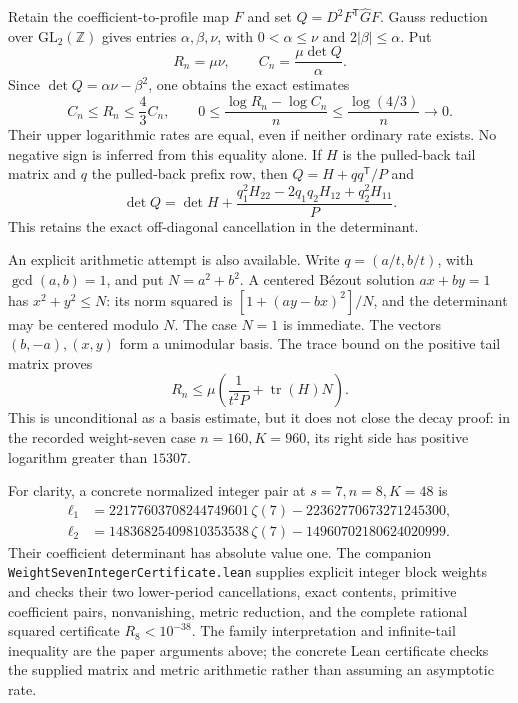 \documentclass[11pt]{article}
\theoremstyle{remark}
\newcommand{\Z}{\mathbb Z}
\begin{document}
Retain the coefficient-to-profile map \(F\) and set
\(Q=D^2F^{\mathsf T}\widehat GF\). Gauss reduction over
\(\mathrm{GL}_2(\Z)\) gives entries \(\alpha,\beta,\nu\), with
\(0<\alpha\le\nu\) and \(2|\beta|\le\alpha\). Put
\[
 R_n=\mu\nu,\qquad C_n=\frac{\mu\det Q}{\alpha}.
\]
Since \(\det Q=\alpha\nu-\beta^2\), one obtains the exact estimates
\begin{equation}
 C_n\le R_n\le\frac43C_n,\qquad
 0\le\frac{\log R_n-\log C_n}{n}
       \le\frac{\log(4/3)}n\longrightarrow0.
 \label{eq:prefix-large-index-equality}
\end{equation}
Their upper logarithmic rates are equal, even if neither ordinary rate
exists. No negative sign is inferred from this equality alone.
If \(H\) is the pulled-back tail matrix and \(q\) the pulled-back
prefix row, then \(Q=H+qq^{\mathsf T}/P\) and
\[
 \det Q=\det H+
 \frac{q_1^2H_{22}-2q_1q_2H_{12}+q_2^2H_{11}}P.
\]
This retains the exact off-diagonal cancellation in the determinant.

An explicit arithmetic attempt is also available. Write
\(q=(a/t,b/t)\), with \(\gcd(a,b)=1\), and put \(N=a^2+b^2\).
A centered B\'ezout solution \(ax+by=1\) has
\(x^2+y^2\le N\): its norm squared is
\([1+(ay-bx)^2]/N\), and the determinant may be centered modulo \(N\).
The case \(N=1\) is immediate. The vectors \((b,-a),(x,y)\) form a
unimodular basis. The trace bound on the positive tail matrix proves
\[
 R_n\le\mu\left(\frac1{t^2P}+\operatorname{tr}(H)N\right).
\]
This is unconditional as a basis estimate, but it does not close the
decay proof: in the recorded weight-seven case \(n=160,K=960\), its
right side has positive logarithm greater than \(15307\).

For clarity, a concrete normalized integer pair at \(s=7,n=8,K=48\) is
\begin{align*}
 \ell_1&=22177603708244749601\,\zeta(7)-22362770673271245300,\\
 \ell_2&=14836825409810353538\,\zeta(7)-14960702180624020999.
\end{align*}
Their coefficient determinant has absolute value one. The companion
\texttt{WeightSevenIntegerCertificate.lean} supplies explicit integer
block weights and checks their two lower-period cancellations, exact
contents, primitive coefficient pairs, nonvanishing, metric reduction,
and the complete rational squared certificate \(R_8<10^{-38}\).
The family interpretation and infinite-tail inequality are the paper
arguments above; the concrete Lean certificate checks the supplied
matrix and metric arithmetic rather than assuming an asymptotic rate.
\end{document}
